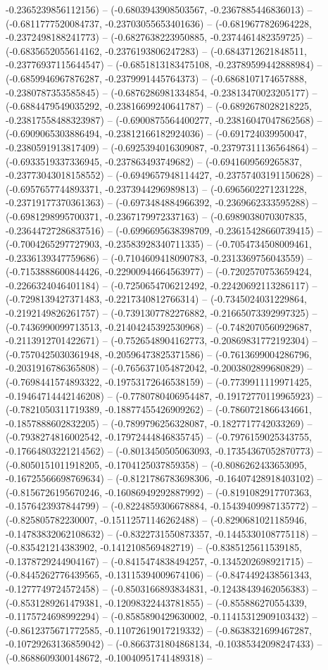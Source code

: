 -0.2365239856112156) -- (-0.6803943908503567, -0.2367885446836013) -- (-0.6811777520084737, -0.23703055653401636) -- (-0.6819677826964228, -0.2372498188241773) -- (-0.6827638223950885, -0.2374461482359725) -- (-0.6835652055614162, -0.2376193806247283) -- (-0.6843712621848511, -0.23776937115644547) -- (-0.6851813183475108, -0.23789599442888984) -- (-0.6859946967876287, -0.2379991445764373) -- (-0.6868107174657888, -0.2380787353585845) -- (-0.6876286981334854, -0.23813470023205177) -- (-0.6884479549035292, -0.23816699240641787) -- (-0.6892678028218225, -0.23817558488323987) -- (-0.6900875564400277, -0.23816047047862568) -- (-0.6909065303886494, -0.23812166182924036) -- (-0.691724039950047, -0.2380591913817409) -- (-0.6925394016309087, -0.23797311136564864) -- (-0.6933519337336945, -0.237863493749682) -- (-0.6941609569265837, -0.23773043018158552) -- (-0.6949657948114427, -0.23757403191150628) -- (-0.6957657744893371, -0.2373944296989813) -- (-0.6965602271231228, -0.23719177370361363) -- (-0.6973484884966392, -0.2369662333595288) -- (-0.6981298995700371, -0.2367179972337163) -- (-0.6989038070307835, -0.23644727286837516) -- (-0.6996695638398709, -0.23615428660739415) -- (-0.7004265297727903, -0.23583928340711335) -- (-0.7054734508009461, -0.2336139347759686) -- (-0.7104609418090783, -0.2313369756043559) -- (-0.7153888600844426, -0.22900944664563977) -- (-0.7202570753659424, -0.2266324046401184) -- (-0.7250654706212492, -0.22420692113286117) -- (-0.7298139427371483, -0.2217340812766314) -- (-0.7345024031229864, -0.2192149826261757) -- (-0.7391307782276882, -0.21665073392997325) -- (-0.7436990099713513, -0.21404245392530968) -- (-0.7482070560929687, -0.2113912701422671) -- (-0.7526548904162773, -0.20869831772192304) -- (-0.7570425030361948, -0.20596473825371586) -- (-0.7613699004286796, -0.2031916786365808) -- (-0.7656371054872042, -0.2003802899680829) -- (-0.7698441574893322, -0.19753172646538159) -- (-0.7739911119971425, -0.19464714442146208) -- (-0.7780780406954487, -0.19172770119965923) -- (-0.7821050311719389, -0.18877455426909262) -- (-0.7860721866434661, -0.1857888602832205) -- (-0.7899796256328087, -0.1827717742033269) -- (-0.7938274816002542, -0.17972444846835745) -- (-0.7976159025343755, -0.17664803221214562) -- (-0.8013450505063093, -0.17354367052870773) -- (-0.8050151011918205, -0.1704125037859358) -- (-0.8086262433653095, -0.16725566698769634) -- (-0.8121786783698306, -0.16407428918403102) -- (-0.8156726195670246, -0.16086949292887992) -- (-0.8191082917707363, -0.1576423937844799) -- (-0.8224859306678884, -0.15439409987135772) -- (-0.825805782230007, -0.15112571146262488) -- (-0.8290681021185946, -0.14783832062108632) -- (-0.8322731550873357, -0.1445330108775118) -- (-0.835421214383902, -0.1412108569482719) -- (-0.8385125611539185, -0.1378729244904167) -- (-0.8415474838494257, -0.1345202698921715) -- (-0.8445262776439565, -0.13115394009674106) -- (-0.8474492438561343, -0.1277749724572458) -- (-0.8503166893834831, -0.12438439462056383) -- (-0.8531289261479381, -0.12098322443781855) -- (-0.855886270554339, -0.1175724698992294) -- (-0.8585890429630002, -0.11415312909103432) -- (-0.8612375671772585, -0.11072619017219332) -- (-0.8638321699467287, -0.10729263136859042) -- (-0.8663731804868134, -0.10385342098247433) -- (-0.8688609300148672, -0.10040951741489318) -- 